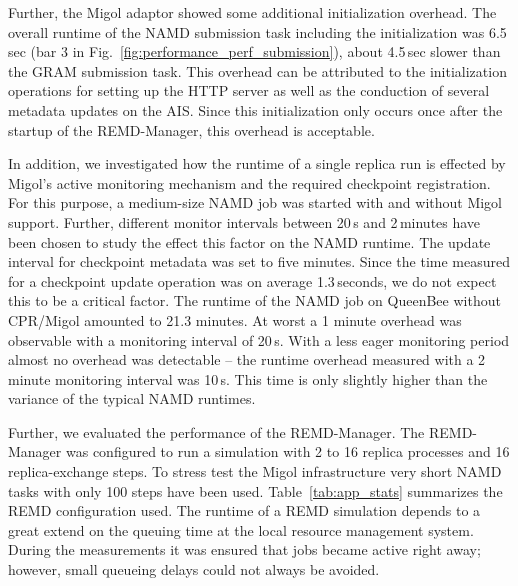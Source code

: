 \documentclass[conference,final]{IEEEtran}
\begin{document}
Further, the Migol adaptor showed some additional initialization
overhead. The overall runtime of the NAMD submission task
including the initialization was 6.5\,sec (bar 3 in
Fig.~\ref{fig:performance_perf_submission}), about 4.5\,sec slower than
the GRAM submission task. This overhead can be attributed to the
initialization operations for setting up the HTTP server as well as
the conduction of several metadata updates on the AIS. Since this
initialization only occurs once after the startup of the REMD-Manager,
this overhead is acceptable.
                                                                                                                    
In addition, we investigated how the runtime of
a single replica run is effected by Migol's active monitoring mechanism
and the required checkpoint registration. For this purpose, 
a medium-size NAMD job was started with and without
Migol support.  Further, different monitor intervals between 20\,s and
2\,minutes have been chosen to study the effect this factor 
on the NAMD runtime.  The update interval for checkpoint
metadata was set to five minutes.  Since the time measured for a
checkpoint update operation was on average 1.3\,seconds, we do not
expect this to be a critical factor.  The runtime of the NAMD job on
QueenBee without CPR/Migol amounted to 21.3 minutes.  At worst a 1
minute overhead was observable with a monitoring interval of
20\,s. With a less eager monitoring period almost no overhead was
detectable -- the runtime overhead measured with a 2\,minute
monitoring interval was 10\,s. This time is only slightly higher than
the variance of the typical NAMD runtimes.

Further, we evaluated the performance of the REMD-Manager.  
The REMD-Manager was configured to run a simulation with 
2 to 16 replica processes and 16 replica-exchange
steps. To stress test the Migol infrastructure very short NAMD tasks
with only 100 steps have been used. Table~\ref{tab:app_stats}
summarizes the REMD configuration used. The runtime of a REMD simulation depends 
to a great extend on the queuing time at the local resource 
management system. During the measurements it was ensured that jobs became 
active right away; however, small queueing delays could not always be avoided.
\end{document}
